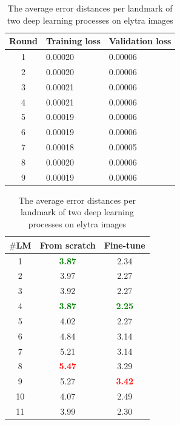 \documentclass[review]{elsarticle}
\begin{document}
\begin{table}[htbp]
	\begin{minipage}[t]{0.45\textwidth}
	\centering
	\begin{tabular}{c p{1.5cm} p{1.5cm}}
	Round & Training loss & Validation loss \\ \hline
	1 & 0.00020 & 0.00006  \\ \hline
	2 & 0.00020 & 0.00006 \\ \hline
	3 & 0.00021 & 0.00006 \\ \hline
	4 & 0.00021 & 0.00006 \\ \hline
	5 & 0.00019 & 0.00006 \\ \hline
	6 & 0.00019 & 0.00006 \\ \hline
	7 & 0.00018 & 0.00005 \\ \hline
	8 & 0.00020 & 0.00006 \\ \hline
	9 & 0.00019 & 0.00006 \\ \hline
	\end{tabular}
	\caption{The losses during fine-tuning model on elytra dataset}
	\label{tblftbody}
\end{minipage}
\hfill
\begin{minipage}[t]{0.45\textwidth}
\centering
\begin{tabular}{|c|c|c|}
\hline
\textbf{$\#$LM} & \textbf{From scratch} & \textbf{Fine-tune} \\ \hline
1 & \textcolor{green}{\textbf{3.87}} & 2.34  \\ \hline
2 & 3.97 & 2.27  \\ \hline
3 & 3.92  & 2.27 \\ \hline
4 & \textcolor{green}{\textbf{3.87}}  & \textcolor{green}{\textbf{2.25}} \\ \hline
5 & 4.02  & 2.27 \\ \hline
6 & 4.84  & 3.14 \\ \hline
7 & 5.21  & 3.14 \\ \hline
8 & \textcolor{red}{\textbf{5.47}}  & 3.29 \\ \hline
9 & 5.27  & \textcolor{red}{\textbf{3.42}} \\ \hline
10 & 4.07  & 2.49 \\ \hline
11 & 3.99  & 2.30 \\ \hline
\end{tabular}
\caption{The average error distances per landmark of two deep learning processes on elytra images}
\label{tblcmpbody}
\end{minipage}
\end{table}
\end{document}
